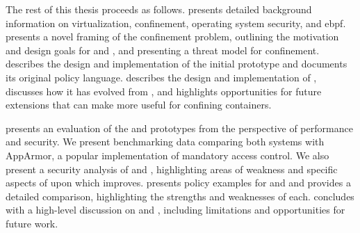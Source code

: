 The rest of this thesis proceeds as follows.  presents detailed
background information on virtualization, confinement, operating system security, and
\gls{ebpf}.   presents a novel framing of the confinement
problem, outlining the motivation and design goals for \bpfbox{} and \bpfcontain{}, and
presenting a threat model for confinement.   describes the design and
implementation of the initial \bpfbox{} prototype and documents its original policy
language.  describes the design and implementation of \bpfcontain{},
discusses how it has evolved from \bpfbox{}, and highlights opportunities for future
extensions that can make \bpfcontain{} more useful for confining containers.

 presents an evaluation of the \bpfbox{} and \bpfcontain{} prototypes
from the perspective of performance and security. We present benchmarking data comparing
both systems with AppArmor, a popular  implementation of mandatory
access control. We also present a security analysis of \bpfbox{} and \bpfcontain{},
highlighting areas of weakness and specific aspects of \bpfbox{} upon which \bpfcontain{}
improves.   presents policy examples for \bpfbox{} and \bpfcontain{}
and provides a detailed comparison, highlighting the strengths and weaknesses of each.
 concludes with a high-level discussion on \bpfbox{} and \bpfcontain{},
including limitations and opportunities for future work.


